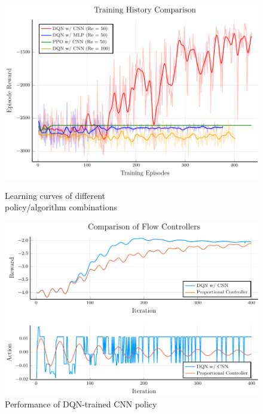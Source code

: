 \documentclass{article}
\begin{document}
\begin{figure}
\centering 
    \begin{minipage}{.5\textwidth}
        \centering
        \includegraphics[scale=0.4]{learning}
        \caption{Learning curves of different \\   policy/algorithm combinations}
        \label{fig:learning}
    \end{minipage}%
    \begin{minipage}{.5\textwidth}
        \centering
        \includegraphics[scale=0.4]{performance}
        \caption{Performance of DQN-trained CNN policy}
        \label{fig:performance}
    \end{minipage}
\end{figure}
\end{document}

